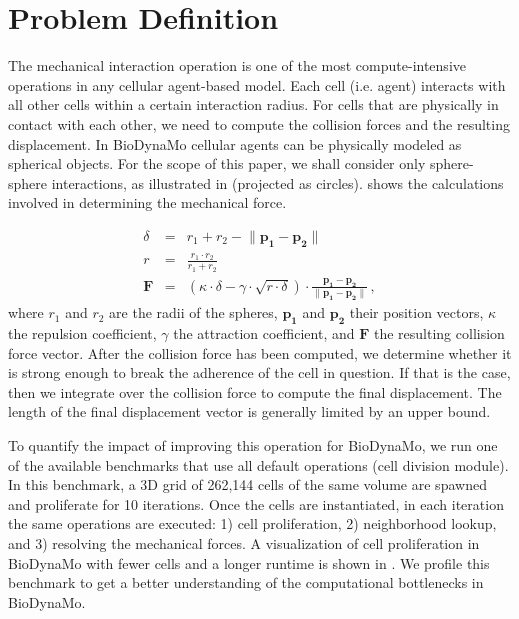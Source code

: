 \documentclass[conference]{IEEEtran}
\begin{document}
\section{Problem Definition} \label{sec:problem_definition}
\par The mechanical interaction operation is one of the most compute-intensive operations in any cellular agent-based model.
Each cell (i.e. agent) interacts with all other cells within a certain interaction radius.
For cells that are physically in contact with each other, we need to compute the collision forces and the resulting displacement.
In BioDynaMo cellular agents can be physically modeled as spherical objects.
For the scope of this paper, we shall consider only sphere-sphere interactions, as illustrated in  (projected as circles).
 \cite{hauri2013self} shows the calculations involved in determining the mechanical force.

\begin{equation}
    \begin{array}{lcl}
        \delta & = & r_1 + r_2 - \lVert \mathbf{p_1} - \mathbf{p_2}\rVert \\[2pt]
        r & = & \frac{r_1 \cdot r_2}{r_1 + r_2} \\[2pt]
        \mathbf{F} & = & (\kappa \cdot \delta - \gamma \cdot \sqrt{r \cdot \delta}) \cdot \frac{\mathbf{p_1} - \mathbf{p_2}}{\lVert \mathbf{p_1} - \mathbf{p_2}\rVert}\,,
    \end{array}
    \label{eq:default_force}
\end{equation}
%
where $r_1$ and $r_2$ are the radii of the spheres, $\mathbf{p_1}$ and $\mathbf{p_2}$ their position vectors, $\kappa$ the repulsion coefficient, $\gamma$ the attraction coefficient, and $\mathbf{F}$ the resulting collision force vector.
After the collision force has been computed, we determine whether it is strong enough to break the adherence of the cell in question.
If that is the case, then we integrate over the collision force to compute the final displacement.
The length of the final displacement vector is generally limited by an upper bound.
\par To quantify the impact of improving this operation for BioDynaMo, we run one of the available benchmarks that use all default operations (cell division module).
In this benchmark, a 3D grid of 262,144 cells of the same volume are spawned and proliferate for 10 iterations.
Once the cells are instantiated, in each iteration the same operations are executed: 1) cell proliferation, 2) neighborhood lookup, and 3) resolving the mechanical forces.
A visualization of cell proliferation in BioDynaMo with fewer cells and a longer runtime is shown in . We profile this benchmark to get a better understanding of the computational bottlenecks in BioDynaMo.
\end{document}
